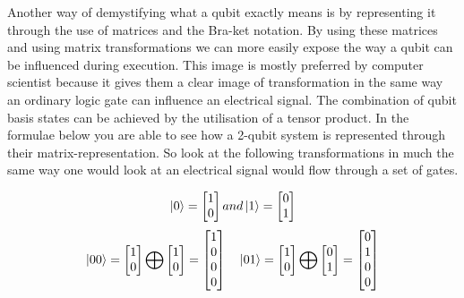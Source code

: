 Another way of demystifying what a qubit exactly means is by representing it through the use of matrices and the Bra-ket notation. By using these matrices and using matrix transformations we can more easily expose the way a qubit can be influenced during execution. This image is mostly preferred by computer scientist because it gives them a clear image of transformation in the same way an ordinary logic gate can influence an electrical signal. The combination of qubit basis states can be achieved by the utilisation of a tensor product. In the formulae below you are able to see how a 2-qubit system is represented through their matrix-representation. So look at the following transformations in much the same way one would look at an electrical signal would flow through a set of gates. 

\[
	\ket{0}=
	\begin{bmatrix}
	1					\\
	0
	\end{bmatrix} 
	and
	\ket{1}=
	\begin{bmatrix}
	0					\\
	1
	\end{bmatrix} 
\]
\[
\ket{00}=
\begin{bmatrix}
1					\\
0
\end{bmatrix} 
\bigoplus
\begin{bmatrix}
1					\\
0
\end{bmatrix} =
\begin{bmatrix}
1					\\
0					\\
0					\\
0					\\
\end{bmatrix}
\quad
\ket{01}=
\begin{bmatrix}
1					\\
0
\end{bmatrix} 
\bigoplus
\begin{bmatrix}
0					\\
1
\end{bmatrix} =
\begin{bmatrix}
0					\\
1					\\
0					\\
0					\\
\end{bmatrix}
\]
